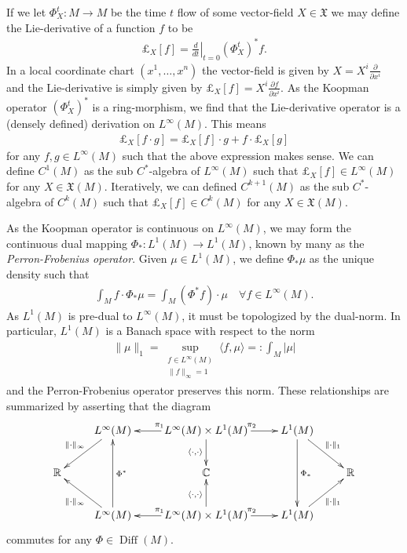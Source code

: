 \documentclass[12pt]{amsart}
\newcommand{\pder}[2]{\ensuremath{\frac{ \partial #1}{\partial #2}}}
\DeclareMathOperator{\Diff}{Diff}
\begin{document}
If we let $\Phi^t_X: M \to M$ be the time $t $ flow of some vector-field $X \in \mathfrak{X}$
we may define the Lie-derivative of a function $f$ to be
\begin{align*}
	\pounds_X[f] = \left. \frac{d}{d t} \right|_{t=0} (\Phi_X^t)^*f.
\end{align*}
In a local coordinate chart $(x^1,\dots,x^n)$ the vector-field is given by $X = X^i \pder{}{x^i}$
and the Lie-derivative is simply given by $\pounds_{X}[f] = X^i \pder{f}{x^i}$.
As the Koopman operator $(\Phi_X^t)^*$ is a ring-morphism, we find that the Lie-derivative operator is a (densely defined) derivation on $L^\infty(M)$.
This means
\begin{align*}
	\pounds_X[ f \cdot g] = \pounds_X[f] \cdot g + f \cdot \pounds_X[g]
\end{align*}
for any $f,g \in L^\infty(M)$ such that the above expression makes sense.
We can define $C^1(M)$ as the sub $C^*$-algebra of $L^\infty(M)$ such that $\pounds_X[f] \in L^\infty(M)$ for any $X \in \mathfrak{X}(M)$.
Iteratively, we can defined $C^{k+1}(M)$ as the sub $C^*$-algebra of $C^{k}(M)$ such that $\pounds_X[f] \in C^k(M)$ for any $X \in \mathfrak{X}(M)$.

As the Koopman operator is continuous on $L^\infty(M)$,
we may form the continuous dual mapping $\Phi_*: L^1(M) \to L^1(M)$,
known by many as the \emph{Perron-Frobenius operator}.
Given $\mu \in L^1(M)$, we define $\Phi_* \mu$ as the unique density such that
\begin{align*}
	\int_M f \cdot \Phi_* \mu = \int_M (\Phi^*f ) \cdot \mu \quad \forall f \in L^\infty(M).
\end{align*}
As $L^1(M)$ is pre-dual to $L^\infty(M)$, it must be topologized by the dual-norm.
In particular, $L^1(M)$ is a Banach space with respect to the norm
\begin{align*}
	\| \mu \|_{1}  = \sup_{
		\substack{
				f \in L^\infty(M) \\
				\| f \|_{\infty} = 1
		}
	} \langle f , \mu \rangle =: \int_M | \mu |
\end{align*}
and the Perron-Frobenius operator preserves this norm.
These relationships are summarized by asserting that the diagram
\begin{equation} \label{cd:classical_duality}
	\xymatrix{
		& \ar[dl]_{\| \cdot \|_{\infty}} L^\infty(M) & \ar[l]_{\pi_1} L^\infty(M)\times L^1(M) \ar[d]_{\langle \cdot , \cdot \rangle} \ar[r]^{\pi_2} & L^1(M)   \ar[dd]^{\Phi_*} \ar[dr]^{\| \cdot \|_{1}}& \\
		\mathbb{R} && \mathbb{C} && \mathbb{R} \\
		& \ar[ul]^{\| \cdot \|_{\infty}} L^\infty(M) \ar[uu]_{\Phi^*} & \ar[l]_{\pi_1} L^\infty(M)\times L^1(M) \ar[u]^{\langle \cdot , \cdot \rangle} \ar[r]^{\pi_2} & L^1(M) \ar[ur]_{\| \cdot \|_{1}} &	
	}
\end{equation}
commutes for any $\Phi \in \Diff(M)$.
\end{document}
